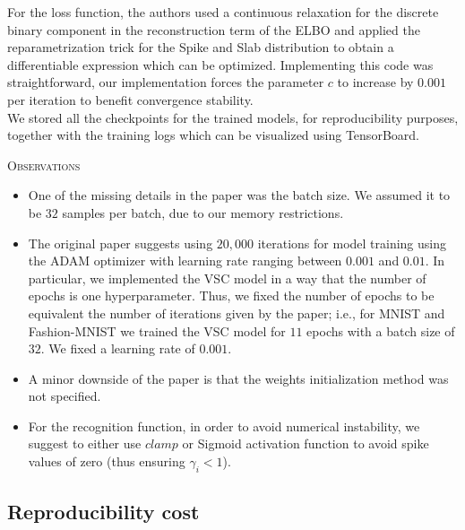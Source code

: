 For the loss function, the authors used a continuous relaxation for the discrete binary component in the reconstruction term of the ELBO and applied the reparametrization trick \supercite{NIPS2015_5666} for the Spike and Slab distribution to obtain a differentiable expression which can be optimized. Implementing this code was straightforward, our implementation forces the parameter $c$ to increase by $0.001$ per iteration to benefit convergence stability. \\

We stored all the checkpoints for the trained models, for reproducibility purposes, together with the training logs which can be visualized using TensorBoard.

\textsc{Observations}
\begin{itemize}
    \item One of the missing details in the paper was the batch size. We assumed it to be $32$ samples per batch, due to our memory restrictions. 
    \item The original paper suggests using $20,000$ iterations for model training using the ADAM optimizer \supercite{kingma2014adam} with learning rate ranging between $0.001$ and $0.01$. In particular, we implemented the VSC model in a way that the number of epochs is one hyperparameter. Thus, we fixed the number of epochs to be equivalent the number of iterations given by the paper; i.e., for MNIST and Fashion-MNIST we trained the VSC model for $11$ epochs with a batch size of $32$. We fixed a learning rate of $0.001$.
    \item A minor downside of the paper is that the weights initialization method was not specified.
    \item For the recognition function, in order to avoid numerical instability, we suggest to either use $\textit{clamp}$ or Sigmoid activation function to avoid spike values of zero (thus ensuring $\gamma_i < 1$).
\end{itemize}

\subsection{Reproducibility cost}

